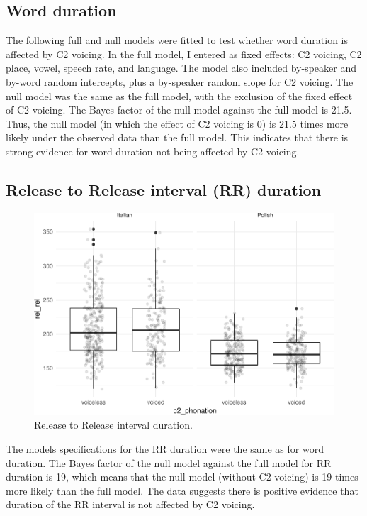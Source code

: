\documentclass[preprint]{JASAnew}
\begin{document}
\hypertarget{word-duration}{%
\subsection{Word duration}\label{word-duration}}

The following full and null models were fitted to test whether word
duration is affected by C2 voicing. In the full model, I entered as
fixed effects: C2 voicing, C2 place, vowel, speech rate, and language.
The model also included by-speaker and by-word random intercepts, plus a
by-speaker random slope for C2 voicing. The null model was the same as
the full model, with the exclusion of the fixed effect of C2 voicing.
The Bayes factor of the null model against the full model is 21.5. Thus,
the null model (in which the effect of C2 voicing is 0) is 21.5 times
more likely under the observed data than the full model. This indicates
that there is strong evidence for word duration not being affected by C2
voicing.

\hypertarget{release-to-release-interval-rr-duration}{%
\subsection{Release to Release interval (RR)
duration}\label{release-to-release-interval-rr-duration}}

\begin{figure}
\centering
\includegraphics{2018-jasa_files/figure-latex/rr-plot-1.pdf}
\caption{Release to Release interval duration.}
\end{figure}

The models specifications for the RR duration were the same as for word
duration. The Bayes factor of the null model against the full model for
RR duration is 19, which means that the null model (without C2 voicing)
is 19 times more likely than the full model. The data suggests there is
positive evidence that duration of the RR interval is not affected by C2
voicing.
\end{document}

